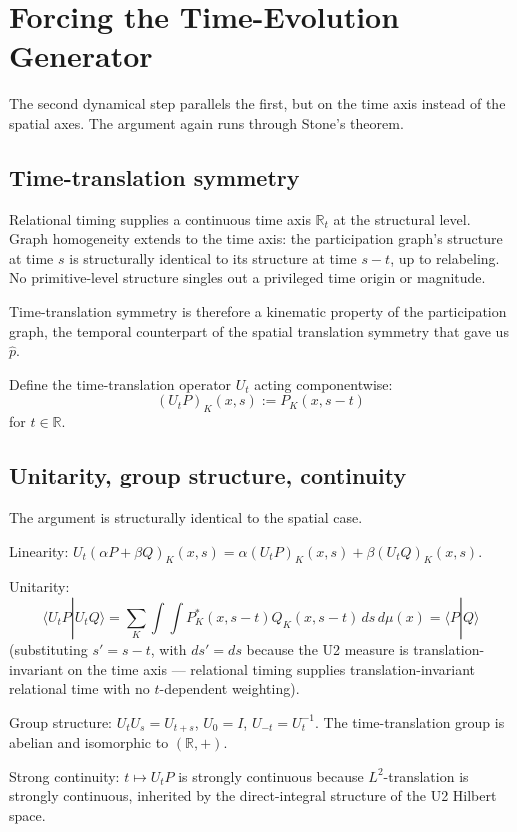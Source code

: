 \documentclass[11pt,a4paper]{article}
\begin{document}
\section{Forcing the Time-Evolution Generator}

The second dynamical step parallels the first, but on the time axis instead of the spatial axes. The argument again runs through Stone's theorem.

\subsection{Time-translation symmetry}

Relational timing supplies a continuous time axis $\mathbb{R}_t$ at the structural level. Graph homogeneity extends to the time axis: the participation graph's structure at time $s$ is structurally identical to its structure at time $s - t$, up to relabeling. No primitive-level structure singles out a privileged time origin or magnitude.

Time-translation symmetry is therefore a kinematic property of the participation graph, the temporal counterpart of the spatial translation symmetry that gave us $\hat{p}$.

Define the time-translation operator $U_t$ acting componentwise:
\[
(U_t P)_K(x, s) := P_K(x, s - t)
\]
for $t \in \mathbb{R}$.

\subsection{Unitarity, group structure, continuity}

The argument is structurally identical to the spatial case.

Linearity: $U_t(\alpha P + \beta Q)_K(x, s) = \alpha(U_t P)_K(x, s) + \beta(U_t Q)_K(x, s)$.

Unitarity:
\[
\langle U_t P | U_t Q\rangle = \sum_K \int\!\!\int P^*_K(x, s-t) Q_K(x, s-t) \, ds \, d\mu(x) = \langle P | Q\rangle
\]
(substituting $s' = s - t$, with $ds' = ds$ because the U2 measure is translation-invariant on the time axis --- relational timing supplies translation-invariant relational time with no $t$-dependent weighting).

Group structure: $U_t U_s = U_{t+s}$, $U_0 = I$, $U_{-t} = U_t^{-1}$. The time-translation group is abelian and isomorphic to $(\mathbb{R}, +)$.

Strong continuity: $t \mapsto U_t P$ is strongly continuous because $L^2$-translation is strongly continuous, inherited by the direct-integral structure of the U2 Hilbert space.
\end{document}
